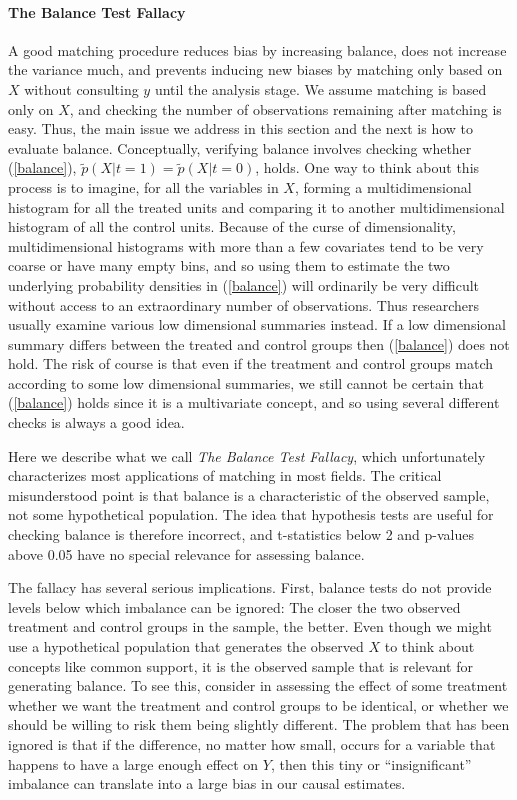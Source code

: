 \documentclass[11pt,titlepage]{article}
\begin{document}
\paragraph{The Balance Test Fallacy}

A good matching procedure reduces bias by increasing balance, does not
increase the variance much, and prevents inducing new biases by
matching only based on $X$ without consulting $y$ until the analysis
stage.  We assume matching is based only on $X$, and checking the
number of observations remaining after matching is easy.  Thus, the
main issue we address in this section and the next is how to evaluate
balance.  Conceptually, verifying balance involves checking whether
(\ref{balance}), $\tilde p(X|t=1)=\tilde p(X|t=0)$, holds.  One way to
think about this process is to imagine, for all the variables in $X$,
forming a multidimensional histogram for all the treated units and
comparing it to another multidimensional histogram of all the control
units.  Because of the curse of dimensionality, multidimensional
histograms with more than a few covariates tend to be very coarse or
have many empty bins, and so using them to estimate the two underlying
probability densities in (\ref{balance}) will ordinarily be very
difficult without access to an extraordinary number of observations.
Thus researchers usually examine various low dimensional summaries
instead.  If a low dimensional summary differs between the treated and
control groups then (\ref{balance}) does not hold.  The risk of course
is that even if the treatment and control groups match according to
some low dimensional summaries, we still cannot be certain that
(\ref{balance}) holds since it is a multivariate concept, and so using
several different checks is always a good idea.

Here we describe what we call \emph{The Balance Test Fallacy}, which
unfortunately characterizes most applications of matching in most
fields.  The critical misunderstood point is that balance is a
characteristic of the observed sample, not some hypothetical
population.  The idea that hypothesis tests are useful for checking
balance is therefore incorrect, and t-statistics below 2 and
p-values above 0.05 have no special relevance for assessing balance.

The fallacy has several serious implications.  First, balance tests do
not provide levels below which imbalance can be ignored: The closer
the two observed treatment and control groups in the sample, the
better.  Even though we might use a hypothetical population that
generates the observed $X$ to think about concepts like common
support, it is the observed sample that is relevant for generating
balance.  To see this, consider in assessing the effect of some
treatment whether we want the treatment and control groups to be
identical, or whether we should be willing to risk them being slightly
different.  The problem that has been ignored is that if the
difference, no matter how small, occurs for a variable that happens to
have a large enough effect on $Y$, then this tiny or ``insignificant''
imbalance can translate into a large bias in our causal estimates.
\end{document}

